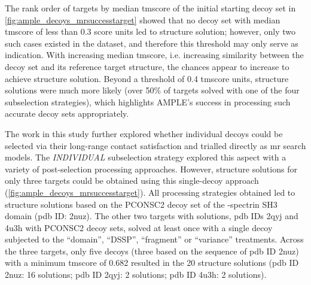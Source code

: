 The rank order of targets by median \gls{tmscore} of the initial starting decoy set in \cref{fig:ample_decoys_mrsuccesstarget} showed that no decoy set with median \gls{tmscore} of less than 0.3 score units led to structure solution; however, only two such cases existed in the dataset, and therefore this threshold may only serve as indication. With increasing median \gls{tmscore}, i.e. increasing similarity between the decoy set and its reference target structure, the chances appear to increase to achieve structure solution. Beyond a threshold of 0.4 \gls{tmscore} units, structure solutions were much more likely (over 50\% of targets solved with one of the four subselection strategies), which highlights AMPLE's success in processing such accurate decoy sets appropriately.

The work in this study further explored whether individual decoys could be selected via their long-range contact satisfaction and trialled directly as \gls{mr} search models. The \textit{INDIVIDUAL} subselection strategy explored this aspect with a variety of post-selection processing approaches. However, structure solutions for only three targets could be obtained using this single-decoy approach (\cref{fig:ample_decoys_mrsuccesstarget}). All processing strategies obtained led to structure solutions based on the PCONSC2 decoy set of the \textalpha-spectrin SH3 domain (\gls{pdb} ID: 2nuz). The other two targets with solutions, \gls{pdb} IDs 2qyj and 4u3h with PCONSC2 decoy sets, solved at least once with a single decoy subjected to the ``domain'', ``DSSP'', ``fragment'' or ``variance'' treatments. Across the three targets, only five decoys (three based on the sequence of \gls{pdb} ID 2nuz) with a minimum \gls{tmscore} of 0.682 resulted in the 20 structure solutions (\gls{pdb} ID 2nuz: 16 solutions; \gls{pdb} ID 2qyj: 2 solutions; \gls{pdb} ID 4u3h: 2 solutions).

